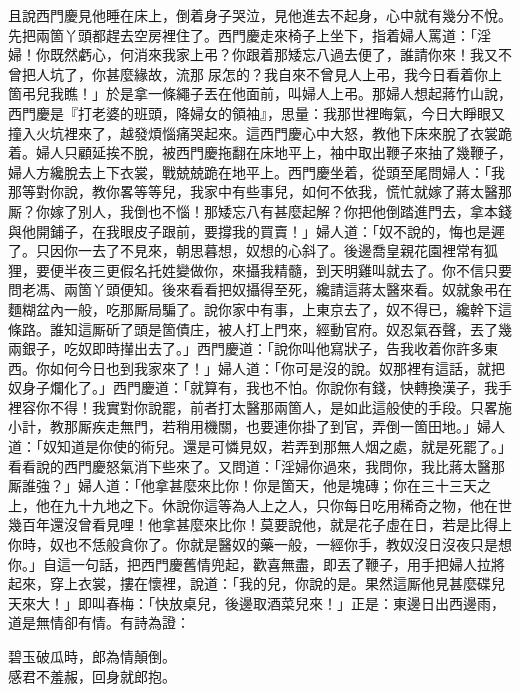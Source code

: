 且說西門慶見他睡在床上，倒着身子哭泣，{}見他進去不起身，心中就有幾分不悅。先把兩箇丫頭都趕去空房裡住了。西門慶走來椅子上坐下，指着婦人罵道：「淫婦！你既然虧心，何消來我家上弔？你跟着那矮忘八過去便了，誰請你來！我又不曾把人坑了，你甚麼緣故，流那𣭈尿怎的？我自來不曾見人上弔，我今日看着你上箇弔兒我瞧！」於是拿一條繩子丟在他面前，叫婦人上弔。那婦人想起蔣竹山說，西門慶是『打老婆的班頭，降婦女的領袖』，思量：我那世裡晦氣，今日大睜眼又撞入火坑裡來了，越發煩惱痛哭起來。{}這西門慶心中大怒，教他下床來脫了衣裳跪着。婦人只顧延挨不脫，被西門慶拖翻在床地平上，袖中取出鞭子來抽了幾鞭子，{}婦人方纔脫去上下衣裳，戰兢兢跪在地平上。西門慶坐着，從頭至尾問婦人：「我那等對你說，教你畧等等兒，我家中有些事兒，如何不依我，慌忙就嫁了蔣太醫那厮？你嫁了別人，我倒也不惱！那矮忘八有甚麼起解？你把他倒踏進門去，拿本錢與他開鋪子，在我眼皮子跟前，要撐我的買賣！」婦人道：「奴不說的，悔也是遲了。只因你一去了不見來，朝思暮想，奴想的心斜了。後邊喬皇親花園裡常有狐狸，要便半夜三更假名托姓變做你，來攝我精髓，到天明雞叫就去了。你不信只要問老馮、兩箇丫頭便知。後來看看把奴攝得至死，纔請這蔣太醫來看。奴就象弔在麵糊盆內一般，吃那厮局騙了。說你家中有事，上東京去了，奴不得已，纔幹下這條路。誰知這厮斫了頭是箇債庄，被人打上門來，經動官府。奴忍氣吞聲，丟了幾兩銀子，吃奴即時攆出去了。」{}西門慶道：「說你叫他寫狀子，告我收着你許多東西。{}你如何今日也到我家來了！」婦人道：「你可是沒的說。奴那裡有這話，就把奴身子爛化了。」西門慶道：「就算有，我也不怕。你說你有錢，快轉換漢子，我手裡容你不得！我實對你說罷，前者打太醫那兩箇人，是如此這般使的手段。只畧施小計，教那厮疾走無門，若稍用機關，也要連你掛了到官，弄倒一箇田地。」婦人道：「奴知道是你使的術兒。還是可憐見奴，若弄到那無人烟之處，就是死罷了。」看看說的西門慶怒氣消下些來了。又問道：「淫婦你過來，我問你，我比蔣太醫那厮誰強？」{}婦人道：「他拿甚麼來比你！你是箇天，他是塊磚；你在三十三天之上，他在九十九地之下。休說你這等為人上之人，只你每日吃用稀奇之物，他在世幾百年還沒曾看見哩！他拿甚麼來比你！莫要說他，就是花子虛在日，若是比得上你時，奴也不恁般貪你了。{}你就是醫奴的藥一般，一經你手，教奴沒日沒夜只是想你。」自這一句話，把西門慶舊情兜起，歡喜無盡，即丟了鞭子，用手把婦人拉將起來，穿上衣裳，摟在懷裡，說道：「我的兒，你說的是。果然這厮他見甚麼碟兒天來大！」即叫春梅：「快放桌兒，後邊取酒菜兒來！」正是：東邊日出西邊雨，道是無情卻有情。有詩為證：

\begin{myquote} 
碧玉破瓜時，郎為情顛倒。\\感君不羞赧，回身就郎抱。
\end{myquote} 

 

